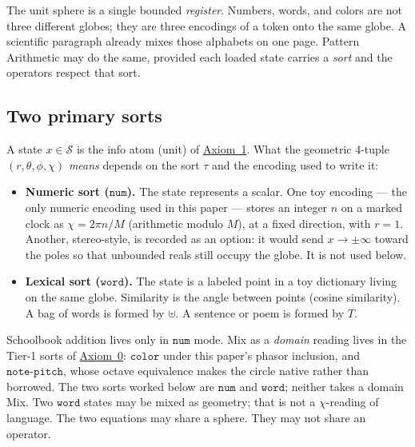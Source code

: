\documentclass[12pt, a4paper]{article}
\begin{document}
The unit sphere is a single bounded \emph{register}.
Numbers, words, and colors are not three different globes; they are
three encodings of a token onto the same globe. A scientific paragraph
already mixes those alphabets on one page. Pattern Arithmetic may do
the same, provided each loaded state carries a \emph{sort} and the
operators respect that sort.

\subsection{Two primary sorts}
\label{subsec:sorts}
A state $x\in\mathcal{S}$ is the info atom (unit) of
\hyperref[subsec:axiom1]{Axiom~1}. What the geometric 4-tuple
$(r,\theta,\phi,\chi)$ \emph{means} depends on the sort $\tau$ and the
encoding used to write it:
\begin{itemize}
    \item \textbf{Numeric sort ($\mathtt{num}$).}
          The state represents a scalar. One toy encoding --- the only
          numeric encoding used in this paper --- stores an
          integer $n$ on a marked clock as
          $\chi = 2\pi n/M$ (arithmetic modulo $M$), at a fixed
          direction, with $r=1$.
          Another, stereo-style, is recorded as an option: it would
          send $x\to\pm\infty$ toward the
          poles so that unbounded reals still occupy the globe. It is
          not used below.
    \item \textbf{Lexical sort ($\mathtt{word}$).}
          The state is a labeled point in a toy dictionary living on
          the same globe. Similarity is the angle between points
          (cosine similarity). A bag of words is formed by $\uplus$.
          A sentence or poem is formed by $T$.
\end{itemize}
Schoolbook addition lives only in $\mathtt{num}$ mode.
Mix as a \emph{domain} reading lives in the Tier-1 sorts of
\hyperref[subsec:axiom0_admissibility]{Axiom~0}: $\mathtt{color}$ under this
paper's phasor inclusion, and $\mathtt{note\text{-}pitch}$, whose
octave equivalence makes the circle native rather than borrowed.
The two sorts worked below are $\mathtt{num}$ and $\mathtt{word}$;
neither takes a domain Mix.
Two $\mathtt{word}$ states may be mixed as geometry; that is not a
$\chi$-reading of language. The two equations may share a sphere.
They may not share an operator.
\end{document}
